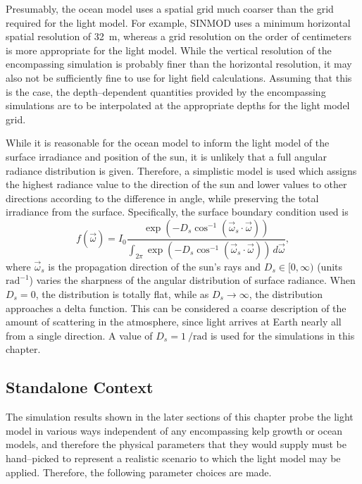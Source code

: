 Presumably, the ocean model uses a spatial grid much coarser than the grid required for the light model.
For example, SINMOD \cite{wassmann_modelling_2006} uses a minimum horizontal spatial resolution of \SI{32}{\m}, whereas a grid resolution on the order of centimeters is more appropriate for the light model.
While the vertical resolution of the encompassing simulation is probably finer than the horizontal resolution, it may also not be sufficiently fine to use for light field calculations.
Assuming that this is the case, the depth--dependent quantities provided by the encompassing simulations are to be interpolated at the appropriate depths for the light model grid.

While it is reasonable for the ocean model to inform the light model of the surface irradiance and position of the sun, it is unlikely that a full angular radiance distribution is given.
Therefore, a simplistic model is used which assigns the highest radiance value to the direction of the sun and lower values to other directions according to the difference in angle, while preserving the total irradiance from the surface.
Specifically, the surface boundary condition used is
\begin{equation}
  f(\vec{\omega}) = I_0\frac{\exp\left( -D_s \cos^{-1}\left(\vec{\omega}_s \cdot \vec{\omega}\right) \right)}{\int_{2\pi}\exp\left( -D_s \cos^{-1}\left(\vec{\omega}_s \cdot \vec{\omega}\right) \right)\, d\vec{\omega}},
\end{equation}
where $\vec{\omega}_s$ is the propagation direction of the sun's rays and $D_s\in[0, \infty)$ (units $\mbox{rad}^{-1}$) varies the sharpness of the angular distribution of surface radiance.
When $D_s=0$, the distribution is totally flat, while as $D_s \to \infty$, the distribution approaches a delta function.
This can be considered a coarse description of the amount of scattering in the atmosphere, since light arrives at Earth nearly all from a single direction.
A value of $D_s=\SI{1}{\per\radian}$ is used for the simulations in this chapter.


\subsection{Standalone Context}
\label{sec:standalone_context}
The simulation results shown in the later sections of this chapter probe the light model in various ways independent of any encompassing kelp growth or ocean models, and therefore the physical parameters that they would supply must be hand--picked to represent a realistic scenario to which the light model may be applied.
Therefore, the following parameter choices are made.

